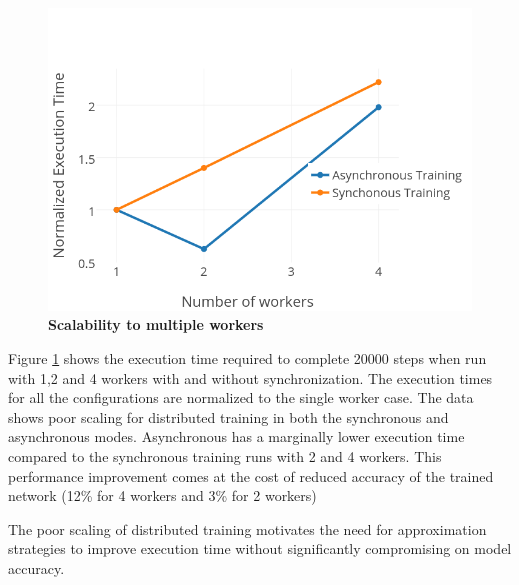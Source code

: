 \begin{figure}[h]
\centering
  \includegraphics[keepaspectratio,width=.9\columnwidth]{figures/15712-corrected-scalability.png}
  \caption{\textbf{Scalability to multiple workers}}
  \label{fig:scalability}
\end{figure}

Figure \ref{fig:scalability} shows the execution time required 
to complete 20000 steps when run with 1,2 and 4 workers with
and without synchronization. The 
execution times for all the configurations are normalized to 
the single worker case. The data shows poor scaling for distributed
training in both the synchronous and asynchronous modes. Asynchronous
has a marginally lower execution time compared to the synchronous 
training runs with 2 and 4 workers. This performance improvement
comes at the cost of reduced accuracy of the trained network (12\%
for 4 workers and 3\% for 2 workers)

The poor scaling of distributed training motivates the need for
approximation strategies to improve execution time without 
significantly compromising on model accuracy.

